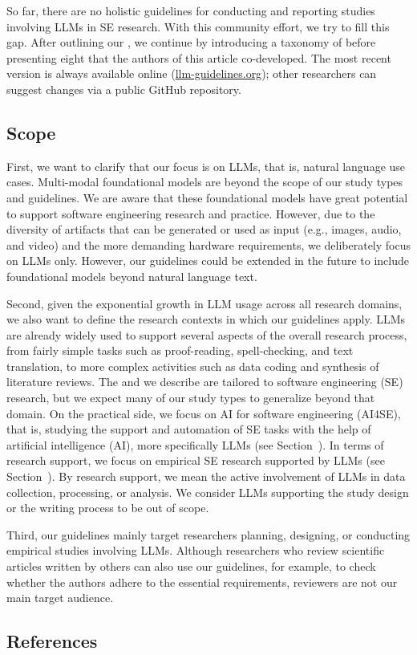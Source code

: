 So far, there are no holistic guidelines for conducting and reporting studies involving LLMs in SE research.
With this community effort, we try to fill this gap.
After outlining our \scope, we continue by introducing a taxonomy of \studytypes before presenting eight \guidelines that the authors of this article co-developed.
The most recent version is always available online (\href{https://llm-guidelines.org/}{llm-guidelines.org}); other researchers can suggest changes via a public GitHub repository.

\subsection{Scope}
\label{sec:scope}

First, we want to clarify that our focus is on LLMs, that is, natural language use cases.
Multi-modal foundational models are beyond the scope of our study types and guidelines.
We are aware that these foundational models have great potential to support software engineering research and practice.
However, due to the diversity of artifacts that can be generated or used as input (e.g., images, audio, and video) and the more demanding hardware requirements, we deliberately focus on LLMs only.
However, our guidelines could be extended in the future to include foundational models beyond natural language text.

Second, given the exponential growth in LLM usage across all research domains, we also want to define the research contexts in which our guidelines apply.
LLMs are already widely used to support several aspects of the overall research process, from fairly simple tasks such as proof-reading, spell-checking, and text translation, to more complex activities such as data coding and synthesis of literature reviews.
The \studytypes and \guidelines we describe are tailored to software engineering (SE) research, but we expect many of our study types to generalize beyond that domain.
On the practical side, we focus on AI for software engineering (AI4SE), that is, studying the support and automation of SE tasks with the help of artificial intelligence (AI), more specifically LLMs (see Section~\llmsforengineers).
In terms of research support, we focus on empirical SE research supported by LLMs (see Section~\llmsforresearcher).
By research support, we mean the active involvement of LLMs in data collection, processing, or analysis.
We consider LLMs supporting the study design or the writing process to be out of scope.

Third, our guidelines mainly target researchers planning, designing, or conducting empirical studies involving LLMs.
Although researchers who review scientific articles written by others can also use our guidelines, for example, to check whether the authors adhere to the essential \must requirements, reviewers are not our main target audience.

\subsection{References}





